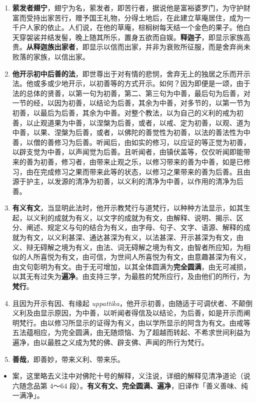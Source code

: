 \begin{enumerate}\item \textbf{萦发者翅宁}，翅宁为名，萦发者，即苦行者，据说他是富裕婆罗门，为守护财富而受持出家苦行，赠予国王礼物，分得土地后，在此建立草庵居住，成为一千户人家的依止。人们说，在他的草庵，棕榈树每天结一个金色的果子。他白天穿袈裟并结发髻，晚上随其所乐，置身五欲而自娱。\textbf{释迦子}，即显示家族高贵。\textbf{从释迦族出家者}，即显示以信而出家，并非为衰败所征服，而是舍弃尚未败落的家族，以信出家。
\item \textbf{他开示初中后善的法}，即世尊出于对有情的悲悯，舍弃无上的独居之乐而开示法。他或多或少地开示，以初善等的方式开示。如何？因为即便是一颂，由于法的总体的贤善，以第一句为初善，第二、第三句为中善，最后句为后善，对一节的经，以因为初善，以结论为后善，其余为中善，对多节的，以第一节为初善，以最后为后善，其余为中善。对整个教法，以为自己的义利的戒为初善，以止观道果为中善，以涅槃为后善，或者，以戒、定为初善，以观、道为中善，以果、涅槃为后善，或者，以佛陀的善觉性为初善，以法的善法性为中善，以僧的善修习为后善。听闻后，由如实的修习，以应证的等正觉为初善，以辟支觉为中善，以声闻觉为后善。且听闻者，由镇伏盖等，仅仅听闻即能带来的善为初善，修习者，由带来止观之乐，以修习带来的善为中善，如是已修习，由在完成修习之果而带来此等的状态，以修习之果带来的善为后善。且由源于护主，以发源的清净为初善，以义利的清净为中善，以作用的清净为后善。
\item \textbf{有义有文}，当显明此法时，他开示教梵行与道梵行，以种种方法显示，如其生起，以义利的成就为有义，以文字的成就为有文，由解释、说明、揭示、区分、阐述、规定义与句的结合为有义，由字母、句子、文字、语源、解释的成就为有文，以义利甚深、通达甚深为有义，以法甚深、开示甚深为有文，由义、辩无碍解之境为有义，由法、词无碍解之境为有文，由智者所应知，为相似的人所喜悦为有文，由可信，为世间人所喜悦为有文，由意趣甚深为有义，由文句彰明为有文。由于无可增加，以其全体圆满为\textbf{完全圆满}，由无可减损，以其无有过失为\textbf{遍净}。由支持三学，为最胜的梵所应行，及由他们的所行，为\textbf{梵行}。
\item 且因为开示有因、有缘起 \textit{uppattika}，他开示初善，由随适于可调伏者、不颠倒义利及由显示原因，为中善，以听闻者得信及以结论，为后善，如是开示而阐明梵行。由以修习所显示的证得为有义，由以学所显示的阿含为有文。由戒等五法蕴相应，为完全圆满，由无随烦恼、为了超越而转起、不希求世间利益为遍净，由以最胜之义成为梵的佛、辟支佛、声闻的所行为梵行。
\item \textbf{善哉}，即善妙，带来义利、带来乐。\end{enumerate}

\begin{itemize}\item 案，这里略去义注中对佛陀十号的解释，义注说，详细的解释见清净道论（说六随念品第 4～64 段）。\textbf{有义有文、完全圆满、遍净}，旧译作「善义善味、纯一满净」。\end{itemize}

